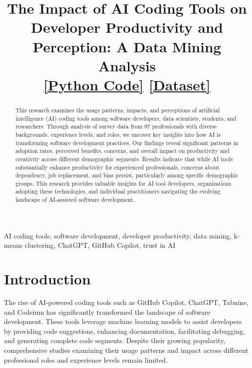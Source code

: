 \documentclass[conference]{IEEEtran}
\begin{document}
\title{The Impact of AI Coding Tools on Developer Productivity and Perception: A Data Mining Analysis\\
\href{https://colab.research.google.com/drive/1mSyvYcl-5a8aZPziLIpSWPAy2do65HaP?usp=sharing}{[Python Code]} \quad
\href{https://drive.google.com/file/d/1RW1vYYOeDhcuN6i1VPSBoXwPqQoqoaoL/view?usp=sharing}{[Dataset]}}

\author{
}

\maketitle

\begin{abstract}
This research examines the usage patterns, impacts, and perceptions of artificial intelligence (AI) coding tools among software developers, data scientists, students, and researchers. Through analysis of survey data from 97 professionals with diverse backgrounds, experience levels, and roles, we uncover key insights into how AI is transforming software development practices. Our findings reveal significant patterns in adoption rates, perceived benefits, concerns, and overall impact on productivity and creativity across different demographic segments. Results indicate that while AI tools substantially enhance productivity for experienced professionals, concerns about dependency, job replacement, and bias persist, particularly among specific demographic groups. This research provides valuable insights for AI tool developers, organizations adopting these technologies, and individual practitioners navigating the evolving landscape of AI-assisted software development.
\end{abstract}

\begin{IEEEkeywords}
AI coding tools, software development, developer productivity, data mining, k-means clustering, ChatGPT, GitHub Copilot, trust in AI
\end{IEEEkeywords}

\section{Introduction}
The rise of AI-powered coding tools such as GitHub Copilot, ChatGPT, Tabnine, and Codeium has significantly transformed the landscape of software development. These tools leverage machine learning models to assist developers by providing code suggestions, enhancing documentation, facilitating debugging, and generating complete code segments. Despite their growing popularity, comprehensive studies examining their usage patterns and impact across different professional roles and experience levels remain limited.
\end{document}
